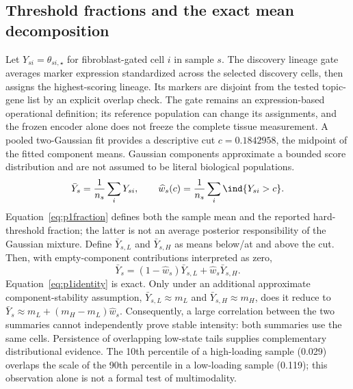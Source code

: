\documentclass[10pt,a4paper]{article}
\begin{document}
\subsection{Threshold fractions and the exact mean decomposition}
Let $Y_{si}=\theta_{si,\star}$ for fibroblast-gated cell $i$ in sample $s$. The discovery lineage gate averages marker expression standardized across the selected discovery cells, then assigns the highest-scoring lineage. Its markers are disjoint from the tested topic-gene list by an explicit overlap check. The gate remains an expression-based operational definition; its reference population can change its assignments, and the frozen encoder alone does not freeze the complete tissue measurement. A pooled two-Gaussian fit provides a descriptive cut $c=0.1842958$, the midpoint of the fitted component means. Gaussian components approximate a bounded score distribution and are not assumed to be literal biological populations.
\begin{equation}
\bar Y_s=\frac1{n_s}\sum_iY_{si},\qquad
\widehat w_s(c)=\frac1{n_s}\sum_i\ind\{Y_{si}>c\}.\label{eq:p1fraction}
\end{equation}
Equation~\eqref{eq:p1fraction} defines both the sample mean and the reported hard-threshold fraction; the latter is not an average posterior responsibility of the Gaussian mixture. Define $\bar Y_{s,L}$ and $\bar Y_{s,H}$ as means below/at and above the cut. Then, with empty-component contributions interpreted as zero,
\begin{equation}
\bar Y_s=(1-\widehat w_s)\bar Y_{s,L}+\widehat w_s\bar Y_{s,H}.\label{eq:p1identity}
\end{equation}
Equation~\eqref{eq:p1identity} is exact. Only under an additional approximate component-stability assumption, $\bar Y_{s,L}\approx m_L$ and $\bar Y_{s,H}\approx m_H$, does it reduce to $\bar Y_s\approx m_L+(m_H-m_L)\widehat w_s$. Consequently, a large correlation between the two summaries cannot independently prove stable intensity: both summaries use the same cells. Persistence of overlapping low-state tails supplies complementary distributional evidence. The 10th percentile of a high-loading sample (0.029) overlaps the scale of the 90th percentile in a low-loading sample (0.119); this observation alone is not a formal test of multimodality.
\end{document}
